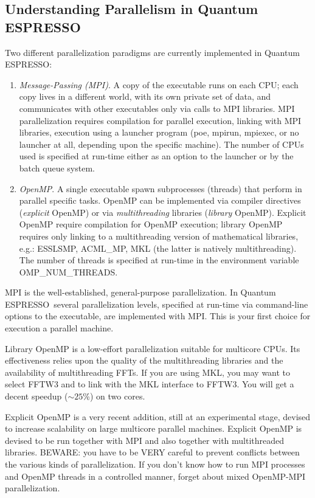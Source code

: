 \documentclass[12pt,a4paper]{article}
\def\qe{{\sc Quantum ESPRESSO}}
\begin{document}
\subsection{Understanding Parallelism in \qe}

Two different parallelization paradigms are currently implemented 
in \qe:
\begin{enumerate}
\item {\em Message-Passing (MPI)}. A copy of the executable runs 
on each CPU; each copy lives in a different world, with its own
private set of data, and communicates with other executables only
via calls to MPI libraries. MPI parallelization requires compilation 
for parallel execution, linking with MPI libraries, execution using 
a launcher program (poe, mpirun, mpiexec, or no launcher at all,
depending upon the specific machine). The number of CPUs used
is specified at run-time either as an option to the launcher or
by the batch queue system. 
\item {\em OpenMP}.  A single executable spawn subprocesses
(threads) that perform in parallel specific tasks. 
OpenMP can be implemented via compiler directives ({\em explicit} 
OpenMP) or via {\em multithreading} libraries  ({\em library} OpenMP).
Explicit OpenMP require compilation for OpenMP execution;
library OpenMP requires only linking to a multithreading
version of mathematical libraries, e.g.:
ESSLSMP, ACML\_MP, MKL (the latter is natively multithreading).
The number of threads is specified at run-time in the environment 
variable OMP\_NUM\_THREADS. 
\end{enumerate}

MPI is the well-established, general-purpose parallelization.
In \qe\ several parallelization levels, specified at run-time
via command-line options to the executable, are implemented
with MPI. This is your first choice for execution a parallel 
machine.

Library OpenMP is a low-effort parallelization suitable for
multicore CPUs. Its effectiveness relies upon the quality of 
the multithreading libraries and the availability of 
multithreading FFTs. If you are using MKL, you may want 
to select FFTW3 and to link with the MKL interface to FFTW3. 
You will get a decent speedup ($\sim 25$\%) on two cores.

Explicit OpenMP is a very recent addition, still at an 
experimental stage, devised to increase scalability on
large multicore parallel machines. Explicit OpenMP is 
devised to be run together with MPI and also together 
with multithreaded libraries. BEWARE: you have to be VERY 
careful to prevent conflicts between the various kinds of
parallelization. If you don't know how to run MPI processes
and OpenMP threads in a controlled manner, forget about mixed 
OpenMP-MPI parallelization.
\end{document}
